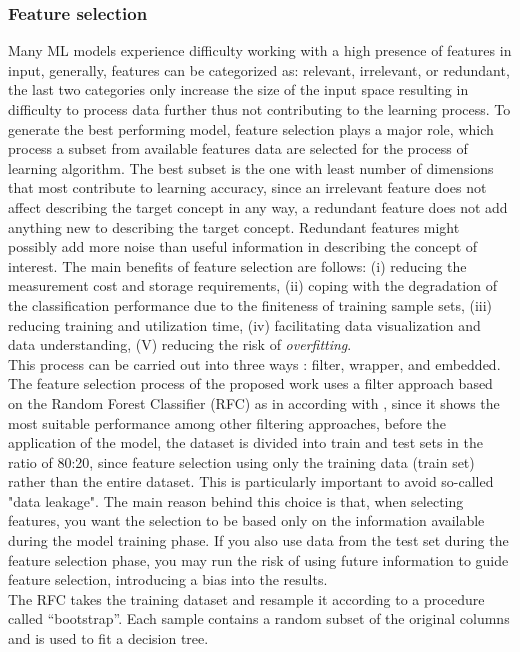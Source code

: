 \documentclass[runningheads]{llncs}
\begin{document}
\subsubsection{Feature selection}
Many ML models experience difficulty working with a high presence of features in input, generally, features can be categorized as: relevant, irrelevant, or redundant, the last two categories only increase the size of the input space \cite{ref_paper9} resulting in difficulty to process data further thus not contributing to the learning process. To generate the best performing model, feature selection plays a major role, which process a subset from available features data are selected for the process of learning algorithm. The best subset is the one with least number of dimensions that most contribute to learning accuracy, since an irrelevant feature does not affect describing the target concept in any way, a redundant feature does not add anything new to describing the target concept. Redundant features might possibly add more noise than useful information in describing the concept of interest. The main benefits of feature selection are follows: (i) reducing the measurement cost and storage requirements, (ii) coping with the degradation of the classification performance due to the finiteness of training sample sets, (iii) reducing training and utilization time, (iv) facilitating data visualization and data understanding, (V) reducing the risk of \textit{overfitting}.\\
This process can be carried out into three ways \cite{paper_feature_selection}: filter, wrapper, and embedded.\\The feature selection process of the proposed work uses a filter approach based on the Random Forest Classifier (RFC) as in according with \cite{paper_rfc}, since it shows the most suitable performance among other filtering approaches, before the application of the model, the dataset is divided into train and test sets in the ratio of 80:20, since feature selection using only the training data (train set) rather than the entire dataset. This is particularly important to avoid so-called "data leakage".
The main reason behind this choice is that, when selecting features, you want the selection to be based only on the information available during the model training phase. If you also use data from the test set during the feature selection phase, you may run the risk of using future information to guide feature selection, introducing a bias into the results.\\
The RFC takes the training dataset and resample it according to a procedure called “bootstrap”. Each sample contains a random subset of the original columns and is used to fit a decision tree. 
\end{document}

